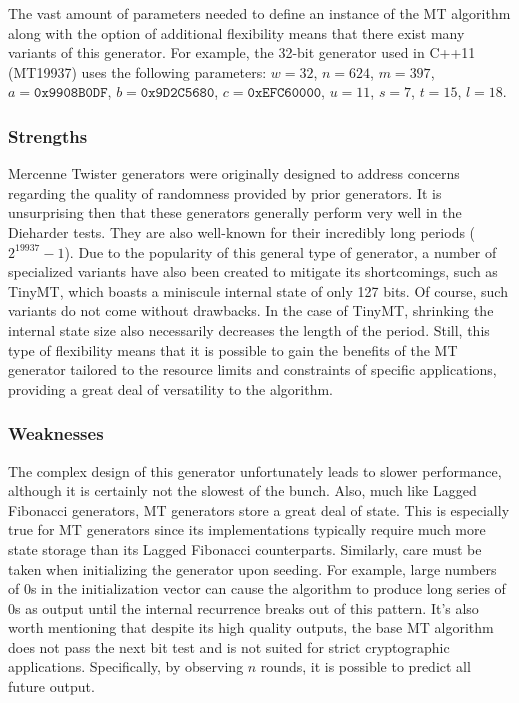 The vast amount of parameters needed to define an instance of the MT algorithm along with the option of additional flexibility means that there exist many variants of this generator. For example, the 32-bit generator used in C++11 (MT19937) uses the following parameters: $w=32$, $n=624$, $m=397$, $a=\texttt{0x9908B0DF}$, $b=\texttt{0x9D2C5680}$, $c=\texttt{0xEFC60000}$, $u=11$, $s=7$, $t=15$, $l=18$.

\subsubsection{Strengths}
Mercenne Twister generators were originally designed to address concerns regarding the quality of randomness provided by prior generators. It is unsurprising then that these generators generally perform very well in the Dieharder tests. They are also well-known for their incredibly long periods ($2^{19937}-1$). Due to the popularity of this general type of generator, a number of specialized variants have also been created to mitigate its shortcomings, such as TinyMT, which boasts a miniscule internal state of only 127 bits. Of course, such variants do not come without drawbacks. In the case of TinyMT, shrinking the internal state size also necessarily decreases the length of the period. Still, this type of flexibility means that it is possible to gain the benefits of the MT generator tailored to the resource limits and constraints of specific applications, providing a great deal of versatility to the algorithm.

\subsubsection{Weaknesses}
The complex design of this generator unfortunately leads to slower performance, although it is certainly not the slowest of the bunch. Also, much like Lagged Fibonacci generators, MT generators store a great deal of state. This is especially true for MT generators since its implementations typically require much more state storage than its Lagged Fibonacci counterparts. Similarly, care must be taken when initializing the generator upon seeding. For example, large numbers of 0s in the initialization vector can cause the algorithm to produce long series of 0s as output until the internal recurrence breaks out of this pattern. It's also worth mentioning that despite its high quality outputs, the base MT algorithm does not pass the next bit test and is not suited for strict cryptographic applications. Specifically, by observing $n$ rounds, it is possible to predict all future output.
